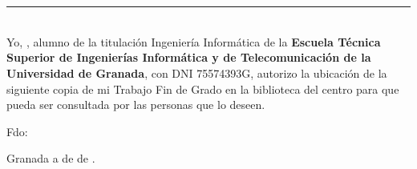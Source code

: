 \chapter*{}
\thispagestyle{empty}

\noindent\rule[-1ex]{\textwidth}{2pt}\\[4.5ex]

Yo, \textbf{\tfgauthorname}, alumno de la titulación Ingeniería Informática de la \textbf{Escuela Técnica Superior
de Ingenierías Informática y de Telecomunicación de la Universidad de Granada}, con DNI 75574393G, autorizo la
ubicación de la siguiente copia de mi Trabajo Fin de Grado en la biblioteca del centro para que pueda ser
consultada por las personas que lo deseen.

\vspace{6cm}

\noindent Fdo: \tfgauthorname

\vspace{2cm}

\begin{flushright}
Granada a  de \tfgmes{} de \tfganno .
\end{flushright}
